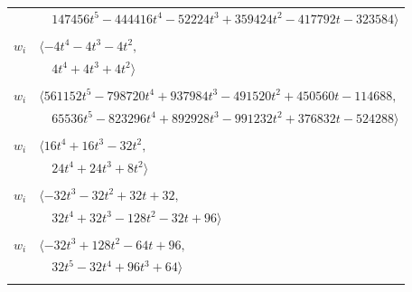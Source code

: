 \documentclass[11pt]{article}
\begin{document}
\begin{longtable}{@{}ll@{}}
 & $\quad 147456t^{5}-444416t^{4}-52224t^{3}+359424t^{2}-417792t-323584\rangle$\\
\addlinespace[2pt]
\multicolumn{2}{@{}p{0.97\textwidth}@{}}{$i=57$, $D_i=2$, $\rho_{ij}$: $0{:}1, \allowbreak 21{:}1, \allowbreak 24{:}1, \allowbreak 27{:}1, \allowbreak 29{:}2, \allowbreak 36{:}1, \allowbreak 54{:}1$}\\
$w_i$ & $\langle -4t^{4}-4t^{3}-4t^{2},$\\
 & $\quad 4t^{4}+4t^{3}+4t^{2}\rangle$\\
\addlinespace[2pt]
\multicolumn{2}{@{}p{0.97\textwidth}@{}}{$i=58$, $D_i=2048$, $\rho_{ij}$: $5{:}1, \allowbreak 8{:}2, \allowbreak 9{:}2, \allowbreak 12{:}1, \allowbreak 18{:}2, \allowbreak 24{:}1, \allowbreak 32{:}2, \allowbreak 33{:}2, \allowbreak 42{:}2, \allowbreak 53{:}2, \allowbreak 64{:}2$}\\
$w_i$ & $\langle 561152t^{5}-798720t^{4}+937984t^{3}-491520t^{2}+450560t-114688,$\\
 & $\quad 65536t^{5}-823296t^{4}+892928t^{3}-991232t^{2}+376832t-524288\rangle$\\
\addlinespace[2pt]
\multicolumn{2}{@{}p{0.97\textwidth}@{}}{$i=59$, $D_i=8$, $\rho_{ij}$: $3{:}2, \allowbreak 8{:}1, \allowbreak 11{:}1, \allowbreak 32{:}2, \allowbreak 40{:}1, \allowbreak 43{:}1, \allowbreak 51{:}1$}\\
$w_i$ & $\langle 16t^{4}+16t^{3}-32t^{2},$\\
 & $\quad 24t^{4}+24t^{3}+8t^{2}\rangle$\\
\addlinespace[2pt]
\multicolumn{2}{@{}p{0.97\textwidth}@{}}{$i=60$, $D_i=32$, $\rho_{ij}$: $5{:}2, \allowbreak 6{:}2, \allowbreak 19{:}1, \allowbreak 21{:}2, \allowbreak 35{:}1, \allowbreak 42{:}1, \allowbreak 45{:}2, \allowbreak 46{:}1$}\\
$w_i$ & $\langle -32t^{3}-32t^{2}+32t+32,$\\
 & $\quad 32t^{4}+32t^{3}-128t^{2}-32t+96\rangle$\\
\addlinespace[2pt]
\multicolumn{2}{@{}p{0.97\textwidth}@{}}{$i=61$, $D_i=32$, $\rho_{ij}$: $3{:}2, \allowbreak 21{:}1, \allowbreak 24{:}1, \allowbreak 42{:}1, \allowbreak 51{:}2, \allowbreak 52{:}1$}\\
$w_i$ & $\langle -32t^{3}+128t^{2}-64t+96,$\\
 & $\quad 32t^{5}-32t^{4}+96t^{3}+64\rangle$\\
\addlinespace[2pt]
\multicolumn{2}{@{}p{0.97\textwidth}@{}}{$i=62$, $D_i=64$, $\rho_{ij}$: $4{:}1, \allowbreak 6{:}2, \allowbreak 20{:}1, \allowbreak 28{:}1, \allowbreak 36{:}1, \allowbreak 45{:}2, \allowbreak 46{:}2, \allowbreak 63{:}1$}\\

\end{longtable}
\end{document}
